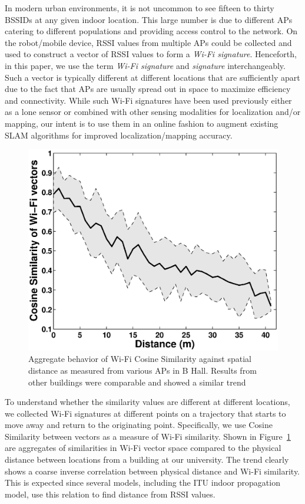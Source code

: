 In modern urban environments, it is not uncommon to see fifteen to thirty BSSIDs at any given indoor location. This large number is due to different APs catering to different populations and providing access control to the network. On the robot/mobile device, RSSI values from multiple APs could be collected and used to construct a vector of RSSI values to form a {\em Wi-Fi signature}. Henceforth, in this paper, we use the term {\em Wi-Fi signature} and {\em signature} interchangeably. Such a vector is typically different at different locations that are sufficiently apart due to the fact that APs are usually spread out in space to maximize efficiency and connectivity. %
While such Wi-Fi signatures have been used previously either as a lone sensor or combined with other sensing modalities for localization and/or mapping, our intent is to use them in an online fashion to augment existing SLAM algorithms for improved localization/mapping accuracy. 

\begin{figure}
\centering		
\includegraphics[width=.3\textwidth]{Figure1.eps}
\caption{Aggregate behavior of Wi-Fi Cosine Similarity against spatial distance as measured from various APs in B Hall. Results from other buildings were comparable and showed a similar trend}
\label{fig:wifi-similarity}
\end{figure}
To understand whether the similarity values are different at different locations, we collected Wi-Fi signatures at different points on a trajectory that starts to move away and return to the originating point. Specifically, we use Cosine Similarity between vectors as a measure of Wi-Fi similarity. 
Shown in Figure~\ref{fig:wifi-similarity} are aggregates of similarities in Wi-Fi vector space compared to the physical distance between locations from a building at our university. The trend clearly shows a coarse inverse correlation between physical distance and Wi-Fi similarity. This is expected since several models, including the ITU indoor propagation model, use this relation to find distance from RSSI values. 
